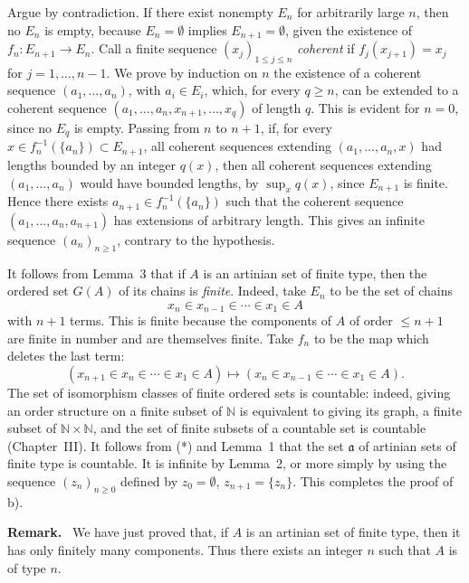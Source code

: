 \documentclass[11pt]{article}
\newcommand{\NN}{\mathbb{N}}
\newenvironment{remarktext}[1]{\par\medskip\noindent\textbf{#1.}\ }{\par\medskip}
\begin{document}
Argue by contradiction. If there exist nonempty \(E_n\) for arbitrarily large \(n\), then no \(E_n\) is empty, because \(E_n=\emptyset\) implies \(E_{n+1}=\emptyset\), given the existence of \(f_n:E_{n+1}\to E_n\). Call a finite sequence \((x_j)_{1\leq j\leq n}\) \emph{coherent} if \(f_j(x_{j+1})=x_j\) for \(j=1,\ldots,n-1\). We prove by induction on \(n\) the existence of a coherent sequence \((a_1,\ldots,a_n)\), with \(a_i\in E_i\), which, for every \(q\geq n\), can be extended to a coherent sequence \((a_1,\ldots,a_n,x_{n+1},\ldots,x_q)\) of length \(q\). This is evident for \(n=0\), since no \(E_q\) is empty. Passing from \(n\) to \(n+1\), if, for every \(x\in f_n^{-1}(\{a_n\})\subset E_{n+1}\), all coherent sequences extending \((a_1,\ldots,a_n,x)\) had lengths bounded by an integer \(q(x)\), then all coherent sequences extending \((a_1,\ldots,a_n)\) would have bounded lengths, by \(\sup_x q(x)\), since \(E_{n+1}\) is finite. Hence there exists \(a_{n+1}\in f_n^{-1}(\{a_n\})\) such that the coherent sequence \((a_1,\ldots,a_n,a_{n+1})\) has extensions of arbitrary length. This gives an infinite sequence \((a_n)_{n\geq1}\), contrary to the hypothesis.

It follows from Lemma~3 that if \(A\) is an artinian set of finite type, then the ordered set \(G(A)\) of its chains is \emph{finite}. Indeed, take \(E_n\) to be the set of chains
\[
 x_n\in x_{n-1}\in\cdots\in x_1\in A
\]
with \(n+1\) terms. This is finite because the components of \(A\) of order \(\leq n+1\) are finite in number and are themselves finite. Take \(f_n\) to be the map which deletes the last term:
\[
 (x_{n+1}\in x_n\in\cdots\in x_1\in A)
 \longmapsto
 (x_n\in x_{n-1}\in\cdots\in x_1\in A).
\]
The set of isomorphism classes of finite ordered sets is countable: indeed, giving an order structure on a finite subset of \(\NN\) is equivalent to giving its graph, a finite subset of \(\NN\times\NN\), and the set of finite subsets of a countable set is countable (Chapter~III). It follows from (*) and Lemma~1 that the set \(\mathfrak a\) of artinian sets of finite type is countable. It is infinite by Lemma~2, or more simply by using the sequence \((z_n)_{n\geq0}\) defined by \(z_0=\emptyset\), \(z_{n+1}=\{z_n\}\). This completes the proof of b).

\begin{remarktext}{Remark}
We have just proved that, if \(A\) is an artinian set of finite type, then it has only finitely many components. Thus there exists an integer \(n\) such that \(A\) is of type \(n\).
\end{remarktext}
\end{document}
